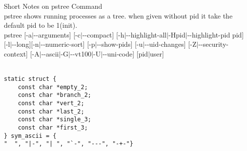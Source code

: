 \documentclass[12pt]{book}
\begin{document}
\huge Short Notes on pstree Command\\

\fontsize{12}{12}
\textsf{pstree shows running processes as a tree. when given without pid it take the default pid to be 1(init).}\\

\fontsize{11}{11}
\textsf{pstree [-a$\mid${-}{-}arguments] [-c$\mid${-}{-}compact] [-h$\mid${-}{-}highlight-all$\mid$-Hpid$\mid${-}{-}highlight-pid pid] [-l$\mid${-}{-}long][-n$\mid${-}{-}numeric-sort] [-p$\mid${-}{-}show-pids] [-u$\mid${-}{-}uid-changes] [-Z$\mid${-}{-}security-context] [-A$\mid${-}{-}ascii$\mid$-G$\mid${-}{-}vt100$\mid$-U$\mid${-}{-}uni‐code] [pid$\mid$user]}\\
\\
\fontsize{10}{10}
\begin{lstlisting}
static struct {
    const char *empty_2;        
    const char *branch_2;        
    const char *vert_2;                
    const char *last_2;                
    const char *single_3;        
    const char *first_3;        
} sym_ascii = {
"  ", "|-", "| ", "`-", "---", "-+-"}
\end{lstlisting}
\end{document}
